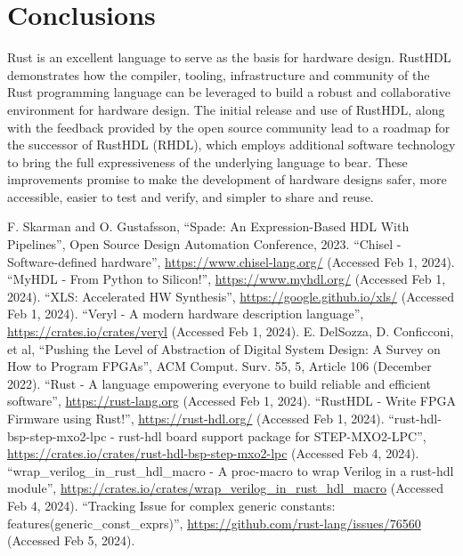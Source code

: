 \documentclass[conference]{IEEEtran}
\begin{document}
\section{Conclusions}\label{sec:conclusions}

Rust is an excellent language to serve as the basis for 
hardware design.  RustHDL demonstrates how the compiler, tooling, infrastructure and 
community of the Rust programming language can be leveraged to build a robust and 
collaborative environment for hardware design.  The initial release and use of RustHDL,
along with the feedback provided by the open source community lead to a roadmap for 
the successor of RustHDL (RHDL), which employs additional software technology to bring
the full expressiveness of the underlying language to bear.  These improvements
promise to make the development of hardware designs safer, more accessible, easier to test and 
verify, and simpler to share and reuse.

\begin{thebibliography}{00}
 F. Skarman and O. Gustafsson, ``Spade: An Expression-Based HDL With Pipelines'', Open Source Design Automation Conference, 2023.
 ``Chisel - Software-defined hardware'', \url{https://www.chisel-lang.org/} (Accessed Feb 1, 2024).
 ``MyHDL - From Python to Silicon!'', \url{https://www.myhdl.org/} (Accessed Feb 1, 2024).
 ``XLS: Accelerated HW Synthesis'', \url{https://google.github.io/xls/} (Accessed Feb 1, 2024).
 ``Veryl - A modern hardware description language'', \url{https://crates.io/crates/veryl} (Accessed Feb 1, 2024).
 E. DelSozza, D. Conficconi, et al,  ``Pushing the Level of Abstraction of Digital System Design: A Survey on How to Program FPGAs'', ACM Comput. Surv. 55, 5, Article 106 (December 2022).
 ``Rust - A language empowering everyone to build reliable and efficient software'', \url{https://rust-lang.org} (Accessed Feb 1, 2024).
 ``RustHDL - Write FPGA Firmware using Rust!'', \url{https://rust-hdl.org/} (Accessed Feb 1, 2024).
 ``rust-hdl-bsp-step-mxo2-lpc - rust-hdl board support package for STEP-MXO2-LPC'', \url{https://crates.io/crates/rust-hdl-bsp-step-mxo2-lpc} (Accessed Feb 4, 2024).
 ``wrap\_verilog\_in\_rust\_hdl\_macro - A proc-macro to wrap Verilog in a rust-hdl module'', \url{https://crates.io/crates/wrap_verilog_in_rust_hdl_macro} (Accessed Feb 4, 2024).
 ``Tracking Issue for complex generic constants: features(generic\_const\_exprs)'', \url{https://github.com/rust-lang/issues/76560} (Accessed Feb 5, 2024).
\end{thebibliography}
\end{document}
